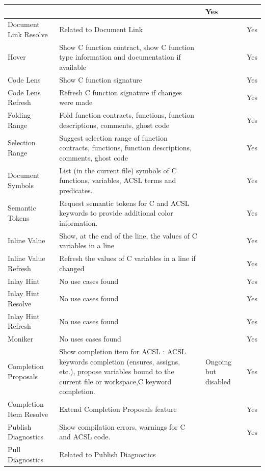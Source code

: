 \documentclass[10pt]{article}
\begin{document}
\begin{singlespace}
\begin{longtable}[H]{|p{3cm}|p{6cm}|p{3cm}|p{2cm}|}
	  & & 
	  Yes \\ \hline
	Document Link Resolve &
	  Related to Document Link
	  & & 
	  Yes \\ \hline
	Hover &
	  Show C function contract, show C function type information and documentation if available
	  & & 
	  Yes \\ \hline
	Code Lens &
	  Show C function signature
	  & & 
	  Yes \\ \hline
	Code Lens Refresh &
	  Refresh C function signature if changes were made
	  & & 
	  Yes \\ \hline
	Folding Range &
	  Fold function contracts, functions, function descriptions, comments, ghost code
	  & & 
	  Yes \\ \hline
	Selection Range &
	  Suggest selection range of function contracts, functions, function descriptions, comments, ghost code
	  & & 
	  Yes \\ \hline
	Document Symbols &
	  List (in the current file) symbols of C functions, variables, ACSL terms and predicates.
	  & & 
	  Yes \\ \hline
	Semantic Tokens &
	  Request semantic tokens for C and ACSL keywords to provide additional color information.
	  & & 
	  Yes \\ \hline
	Inline Value &
	  Show, at the end of the line, the values of C variables in a line
	  & & 
	  Yes \\ \hline
	Inline Value Refresh &
	  Refresh the values of C variables in a line if changed
	  & & 
	  Yes \\ \hline
	Inlay Hint &
	  No use cases found
	  & & 
	  Yes \\ \hline
	Inlay Hint Resolve &
	  No use cases found
	  & & 
	  Yes \\ \hline
	Inlay Hint Refresh &
	  No use cases found
	  & & 
	  Yes \\ \hline
	Moniker &
	  No uses cases found
	  & & 
	  Yes \\ \hline
	Completion Proposals &
	  Show completion item for ACSL : ACSL keywords completion (ensures, assigns, etc.), propose variables bound to the current file or workspace,C keyword completion.
	  & Ongoing but disabled &
	  Yes \\ \hline
	Completion Item Resolve &
	  Extend Completion Proposals feature
	  & & 
	  Yes \\ \hline
	Publish Diagnostics &
	  Show compilation errors, warnings for C and ACSL code.
	  & & 
	  Yes \\ \hline
	Pull Diagnostics &
	  Related to Publish Diagnostics

\end{longtable}
\end{singlespace}
\end{document}
